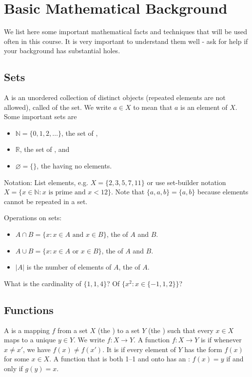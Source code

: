 \setcounter{chapter}{-1}
\chapter{Basic Mathematical Background}
\label{ch:app:mathtools}

We list here some important mathematical facts and techniques  that will be used often in this course. 
It is very important to understand them well - ask for help if your background has substantial holes.


\section{Sets}
A  is an unordered collection of distinct objects (repeated elements are not allowed), called  of the set. 
We write $a \in X$ to mean that $a$ is an element of $X$. Some important sets are 
\begin{itemize}
\item $\mathbb{N} = \{0, 1, 2, \dots\}$, the set of ,
\item $\mathbb{R}$, the set of , and
\item $\varnothing = \{\}$, the  having no elements.
\end{itemize}

Notation: List elements, e.g. $X = \{2,3,5,7,11\}$ or use set-builder notation $X = \{x \in \mathbb{N} : x \text{ is prime and } x < 12\}$. 
Note that $\{a, a, b\} = \{a, b\}$ because elements cannot be repeated in a set.

Operations on sets: 
\begin{itemize}
\item $A\cap B = \{x: x \in A \text{ and } x \in B\}$, the  of $A$ and $B$.
\item $A\cup B = \{x: x \in A \text{ or  } x \in B\}$, the  of $A$ and $B$.
\item $|A|$ is the number of elements of $A$, the  of $A$.
\end{itemize}

\begin{Boxample}[4]
What is the cardinality of $\{1,1,4\}$? Of $\{x^2 : x \in \{-1,1,2\}\}$?
\end{Boxample}


\section{Functions}
A  is a mapping $f$ from a set $X$ (the ) to a set $Y$ (the ) such that every $x \in X$ maps to a unique $y \in Y$. 
We write $f \colon X \to Y$. A function $f \colon X \to Y$ is  if whenever $x \neq x'$, we have $f(x) \neq f(x')$.
 It is  if every element of $Y$ has the form $f(x)$ for some $x\in X$. 
 A function that is both 1--1 and onto has an : $f(x) = y$ if and only if $g(y) = x$. 

